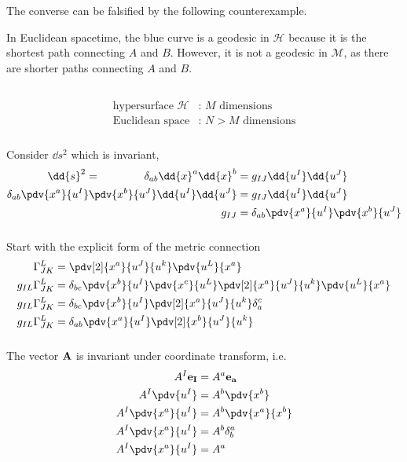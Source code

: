 \documentclass[12pt]{article}
\begin{document}
    The converse can be falsified by the following counterexample.
    \begin{center}
        \def\svgwidth{200pt}
    \end{center}
    In Euclidean spacetime, the blue curve is a geodesic in \(\mathcal{H}\) because it is the shortest path connecting \(A\) and \(B\). However, it is not a geodesic in \(\mathcal M\), as there are shorter paths connecting $A$ and $B$.
    \subsection{} { \begin{align*}
        \text{hypersurface } \mathcal{H} &\text{: \(M\) dimensions}\\
        \text{Euclidean space} &\text{: \(N > M\) dimensions}
    \end{align*}}
    \subsubsection{} Consider \(\dd{s}^2\) which is invariant, \begin{align*}
        \dd{s}^2 =\qquad \qquad \delta_{ab} \dd{x}^a \dd{x}^b &= g_{IJ} \dd{u^I} \dd{u^J}\\
        \delta_{ab} \pdv{x^a}{u^I} \pdv{x^b}{u^J} \dd{u^I} \dd{u^J} &= g_{IJ} \dd{u^I} \dd{u^J}\\
        g_{IJ} &= \delta_{ab} \pdv{x^a}{u^I} \pdv{x^b}{u^J} 
    \end{align*}
    \subsubsection{} Start with the explicit form of the metric connection \begin{align*}
       \Gamma^{L}_{JK} &= \pdv[2]{x^a}{u ^J}{u^k} \pdv{u^L}{x^a}\\
       g_{IL}\Gamma^{L}_{JK} &= \delta_{bc}\pdv{x^b}{u^I}\pdv{x^c}{u^L}\pdv[2]{x^a}{u ^J}{u^k} \pdv{u^L}{x^a}\\
       g_{IL}\Gamma^{L}_{JK} &= \delta_{bc}\pdv{x^b}{u^I}\pdv[2]{x^a}{u ^J}{u^k} \delta^c_{a}\\
       g_{IL}\Gamma^{L}_{JK} &= \delta_{ab}\pdv{x^a}{u^I}\pdv[2]{x^b}{u^J}{u^k}
    \end{align*}
    \subsubsection{} The vector \(\bf A\) is invariant under coordinate transform, i.e. \begin{align*}
        A^I \bf e_I &= A^a \bf e_a\\
        A^I \pdv{u^I} &= A^b \pdv{x^b}\\
        A^I \pdv{x^a}{u^I} &= A^b \pdv{x^a}{x^b}\\
        A^I \pdv{x^a}{u^I} &= A^b \delta^a_{b}\\
        A^I \pdv{x^a}{u^I} &= A^a
    \end{align*}
\end{document}
